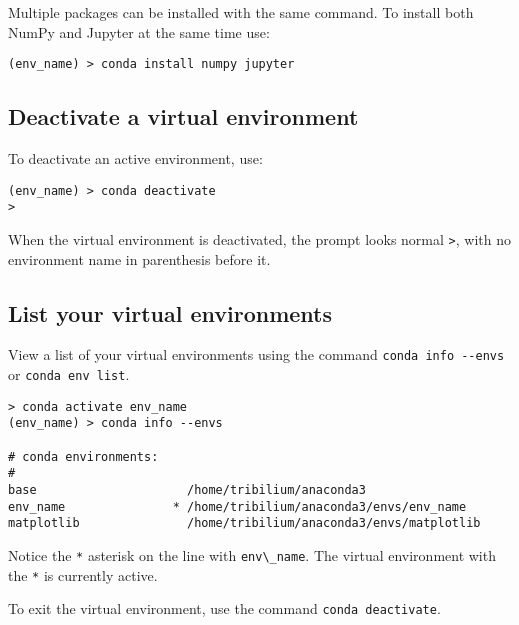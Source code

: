 \documentclass{book}
\newcommand{\passthrough}[1]{#1}
\begin{document}
Multiple packages can be installed with the same command. To install
both NumPy and Jupyter at the same time use:

\begin{lstlisting}
(env_name) > conda install numpy jupyter
\end{lstlisting}
    




    
        \hypertarget{deactivate-a-virtual-environment}{%
\subsection{Deactivate a virtual
environment}\label{deactivate-a-virtual-environment}}

To deactivate an active environment, use:

\begin{lstlisting}
(env_name) > conda deactivate
>
\end{lstlisting}

When the virtual environment is deactivated, the prompt looks normal
\passthrough{\lstinline!>!}, with no environment name in parenthesis
before it.
    




    
        \hypertarget{list-your-virtual-environments}{%
\subsection{List your virtual
environments}\label{list-your-virtual-environments}}

View a list of your virtual environments using the command
\passthrough{\lstinline!conda info --envs!} or
\passthrough{\lstinline!conda env list!}.

\begin{lstlisting}
> conda activate env_name
(env_name) > conda info --envs

# conda environments:
#
base                     /home/tribilium/anaconda3
env_name               * /home/tribilium/anaconda3/envs/env_name
matplotlib               /home/tribilium/anaconda3/envs/matplotlib
\end{lstlisting}

Notice the \passthrough{\lstinline!*!} asterisk on the line with
\passthrough{\lstinline!env\_name!}. The virtual environment with the
\passthrough{\lstinline!*!} is currently active.

To exit the virtual environment, use the command
\passthrough{\lstinline!conda deactivate!}.
\end{document}
